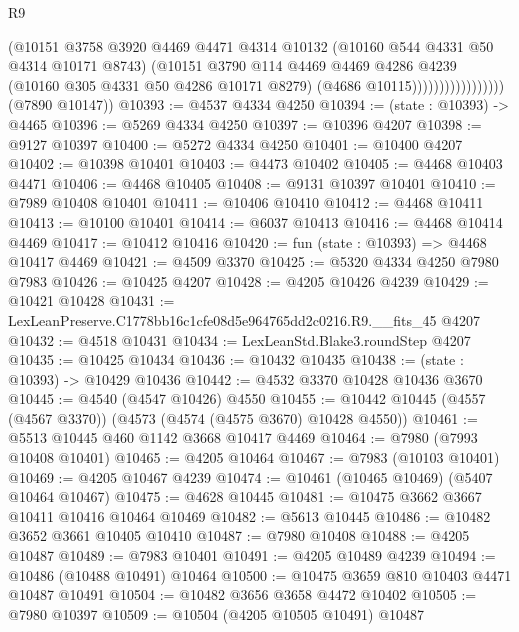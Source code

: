 \begin{lexlean}{R9}
\begin{coremodule}
                                  (@10151
                                    @3758
                                    @3920
                                    @4469
                                    @4471
                                    @4314
                                    @10132
                                    (@10160 @544 @4331 @50 @4314 @10171 @8743)
                                    (@10151
                                      @3790
                                      @114
                                      @4469
                                      @4469
                                      @4286
                                      @4239
                                      (@10160 @305 @4331 @50 @4286 @10171 @8279)
                                      (@4686 @10115)))))))))))))))))
      (@7890 @10147))
@10393 := @4537 @4334 @4250
@10394 := (state : @10393) -> @4465
@10396 := @5269 @4334 @4250
@10397 := @10396 @4207
@10398 := @9127 @10397
@10400 := @5272 @4334 @4250
@10401 := @10400 @4207
@10402 := @10398 @10401
@10403 := @4473 @10402
@10405 := @4468 @10403 @4471
@10406 := @4468 @10405
@10408 := @9131 @10397 @10401
@10410 := @7989 @10408 @10401
@10411 := @10406 @10410
@10412 := @4468 @10411
@10413 := @10100 @10401
@10414 := @6037 @10413
@10416 := @4468 @10414 @4469
@10417 := @10412 @10416
@10420 := fun (state : @10393) => @4468 @10417 @4469
@10421 := @4509 @3370
@10425 := @5320 @4334 @4250 @7980 @7983
@10426 := @10425 @4207
@10428 := @4205 @10426 @4239
@10429 := @10421 @10428
@10431 := LexLeanPreserve.C1778bb16c1cfe08d5e964765dd2c0216.R9.__fits_45 @4207
@10432 := @4518 @10431
@10434 := LexLeanStd.Blake3.roundStep @4207
@10435 := @10425 @10434
@10436 := @10432 @10435
@10438 := (state : @10393) -> @10429 @10436
@10442 := @4532 @3370 @10428 @10436 @3670
@10445 := @4540 (@4547 @10426) @4550
@10455 := @10442 @10445 (@4557 (@4567 @3370)) (@4573 (@4574 (@4575 @3670) @10428 @4550))
@10461 := @5513 @10445 @460 @1142 @3668 @10417 @4469
@10464 := @7980 (@7993 @10408 @10401)
@10465 := @4205 @10464
@10467 := @7983 (@10103 @10401)
@10469 := @4205 @10467 @4239
@10474 := @10461 (@10465 @10469) (@5407 @10464 @10467)
@10475 := @4628 @10445
@10481 := @10475 @3662 @3667 @10411 @10416 @10464 @10469
@10482 := @5613 @10445
@10486 := @10482 @3652 @3661 @10405 @10410
@10487 := @7980 @10408
@10488 := @4205 @10487
@10489 := @7983 @10401
@10491 := @4205 @10489 @4239
@10494 := @10486 (@10488 @10491) @10464
@10500 := @10475 @3659 @810 @10403 @4471 @10487 @10491
@10504 := @10482 @3656 @3658 @4472 @10402
@10505 := @7980 @10397
@10509 := @10504 (@4205 @10505 @10491) @10487

\end{coremodule}
\end{lexlean}
